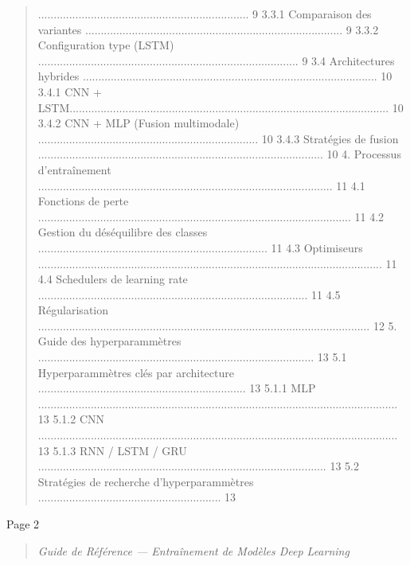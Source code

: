 \documentclass[
]{article}
\begin{document}
\begin{quote}
.................................................................... 9
3.3.1 Comparaison des variantes
...................................................................................
9 3.3.2 Configuration type (LSTM)
....................................................................................
9 3.4 Architectures hybrides
...............................................................................................
10 3.4.1 CNN +
LSTM.......................................................................................................
10 3.4.2 CNN + MLP (Fusion multimodale)
.......................................................................
10 3.4.3 Stratégies de fusion
............................................................................................
10 4. Processus d'entraînement
...............................................................................................
11 4.1 Fonctions de perte
.....................................................................................................
11 4.2 Gestion du déséquilibre des classes
..........................................................................
11 4.3 Optimiseurs
...............................................................................................................
11 4.4 Schedulers de learning rate
.......................................................................................
11 4.5 Régularisation
...........................................................................................................
12 5. Guide des hyperparammètres
.........................................................................................
13 5.1 Hyperparammètres clés par architecture
................................................................... 13
5.1.1 MLP
....................................................................................................................
13 5.1.2 CNN
....................................................................................................................
13 5.1.3 RNN / LSTM / GRU
.............................................................................................
13 5.2 Stratégies de recherche d'hyperparammètres
........................................................... 13
\end{quote}

Page 2

\begin{quote}
\emph{Guide de Référence --- Entraînement de Modèles Deep Learning}
\end{quote}
\end{document}
